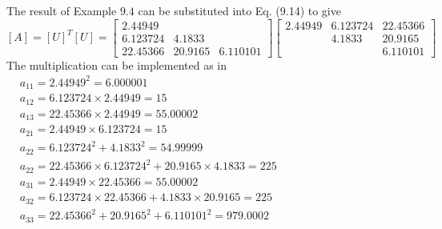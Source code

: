 \documentclass[../main.tex]{subfiles}
\begin{document}
\section{}
The result of Example $9.4$ can be substituted into Eq. (9.14) to give
\bigbreak
$[A]=[U]^{T}[U]=\left[\begin{array}{ccc}2.44949 & & \\ 6.123724 & 4.1833 & \\ 22.45366 & 20.9165 & 6.110101\end{array}\right]\left[\begin{array}{ccc}2.44949 & 6.123724 & 22.45366 \\ & 4.1833 & 20.9165 \\ & & 6.110101\end{array}\right]$
\bigbreak
The multiplication can be implemented as in
\bigbreak$
\begin{aligned}
&a_{11}=2.44949^{2}=6.000001 \\
&a_{12}=6.123724 \times 2.44949=15 \\
&a_{13}=22.45366 \times 2.44949=55.00002 \\
&a_{21}=2.44949 \times 6.123724=15 \\
&a_{22}=6.123724^{2}+4.1833^{2}=54.99999 \\
&a_{22}=22.45366 \times 6.123724^{2}+20.9165 \times 4.1833=225 \\
&a_{31}=2.44949 \times 22.45366=55.00002 \\
&a_{32}=6.123724 \times 22.45366+4.1833 \times 20.9165=225 \\
&a_{33}=22.45366^{2}+20.9165^{2}+6.110101^{2}=979.0002
\end{aligned}$
\bigbreak
\end{document}
